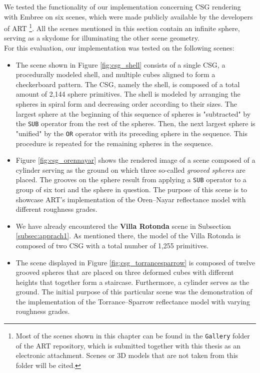 We tested the functionality of our implementation concerning CSG rendering with Embree on six scenes, which were made publicly available by the developers of ART \footnote{Most of the scenes shown in this chapter can be found in the \texttt{Gallery} folder of the ART repository, which is submitted together with this thesis as an electronic attachment. Scenes or 3D models that are not taken from this folder will be cited.}. All the scenes mentioned in this section contain an infinite sphere, serving as a skydome for illuminating the other scene geometry. 
\\

\noindent For this evaluation, our implementation was tested on the following scenes:
\begin{itemize}
	\setlength\itemsep{0.05em}
	
	\item The scene shown in Figure \ref{fig:csg_shell} consists of a single CSG, a procedurally modeled shell, and multiple cubes aligned to form a checkerboard pattern. The CSG, namely the shell, is composed of a total amount of 2,144 sphere primitives. The shell is modeled by arranging the spheres in spiral form and decreasing order according to their sizes. The largest sphere at the beginning of this sequence of spheres is "subtracted" by the \texttt{SUB} operator from the rest of the spheres. Then, the next largest sphere is "unified" by the \texttt{OR} operator with its preceding sphere in the sequence. This procedure is repeated for the remaining spheres in the sequence.
	
	\item  Figure \ref{fig:csg_orennayar} shows the rendered image of a scene composed of a cylinder serving as the ground on which three so-called \emph{grooved spheres} are placed. The grooves on the sphere result from applying a \texttt{SUB} operator to a group of six tori and the sphere in question.
	The purpose of this scene is to showcase ART's implementation of the Oren–Nayar reflectance model \cite{oren1994generalization} with different roughness grades.
	
	\item We have already encountered the \textbf{Villa Rotonda} scene in Subsection \ref{subsec:apprach1}. As mentioned there, the model of the Villa Rotonda is composed of two CSG with a total number of 1,255 primitives.
		
	\item The scene displayed in Figure \ref{fig:csg_torrancesparrow} is composed of twelve grooved spheres that are placed on three deformed cubes with different heights that together form a staircase. Furthermore, a cylinder serves as the ground. The initial purpose of this particular scene was the demonstration of the implementation of the Torrance–Sparrow reflectance model \cite{torrance1967theory} with varying roughness grades.
	

\end{itemize}
